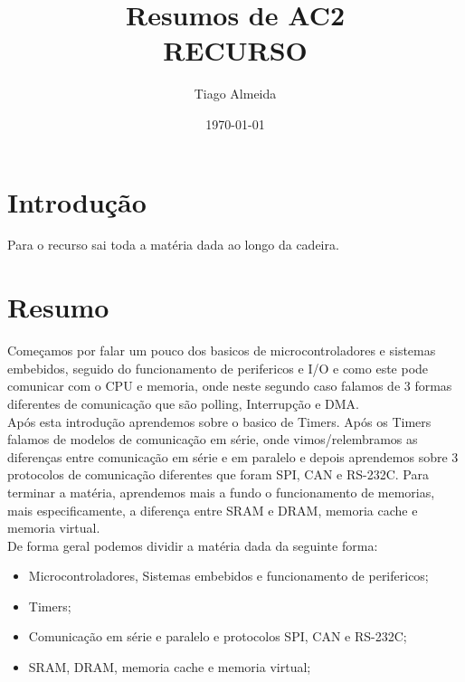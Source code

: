 \documentclass[a4paper, 11pt, onecolumn, oneside]{scrartcl}
\title{%
  Resumos de AC2 \\
  \large RECURSO}
\author{Tiago Almeida}
\date{\today}
\begin{document}
\maketitle

\tableofcontents

\clearpage

\section{Introdução}
Para o recurso sai toda a matéria dada ao longo da cadeira.

\section{Resumo}
Começamos por falar um pouco dos basicos de microcontroladores e sistemas embebidos, seguido do funcionamento de perifericos e I/O e como este pode comunicar
com o CPU e memoria, onde neste segundo caso falamos de 3 formas diferentes de comunicação que são polling, Interrupção e DMA.\\
Após esta introdução aprendemos sobre o basico de Timers.
Após os Timers falamos de modelos de comunicação em série, onde vimos/relembramos as diferenças entre comunicação em série e em paralelo e 
depois aprendemos sobre 3 protocolos de comunicação diferentes que foram SPI, CAN e RS-232C.
Para terminar a matéria, aprendemos mais a fundo o funcionamento de memorias, mais especificamente, a diferença entre SRAM e DRAM, memoria cache e memoria virtual.\\
\newline
De forma geral podemos dividir a matéria dada da seguinte forma:
\begin{itemize}
    \item Microcontroladores, Sistemas embebidos e funcionamento de perifericos;
    \item Timers;
    \item Comunicação em série e paralelo e protocolos SPI, CAN e RS-232C;\@
    \item SRAM, DRAM, memoria cache e memoria virtual; 
\end{itemize}  
\end{document}
